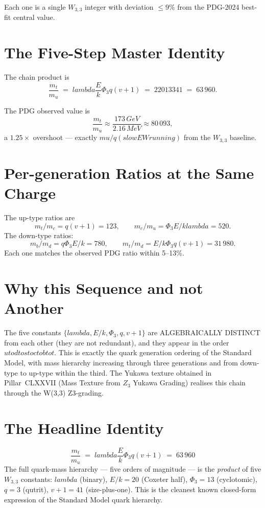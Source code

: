 \documentclass[12pt,a4paper]{article}
\def\mathbb#1{#1}%
\def\text#1{#1}%
\def\lambda{lambda}%
\def\mu{mu}%
\def\Phi#1{Phi#1}%
\def\cdot{ }%
\def\to{ to }%
\theoremstyle{definition}
\newcommand{\ZZ}{\mathbb{Z}}
\begin{document}
Each one is a single $W_{3,3}$ integer with deviation $\le 9\%$ from
the PDG-2024 best-fit central value.

\section*{The Five-Step Master Identity}

The chain product is
\[
\boxed{\;\frac{m_t}{m_u} \;=\; \lambda \cdot \frac{E}{k} \cdot \Phi_3 \cdot q \cdot (v+1)
\;=\; 2 \cdot 20 \cdot 13 \cdot 3 \cdot 41 \;=\; 63\,960.\;}
\]

The PDG observed value is
\[
\frac{m_t}{m_u} \approx \frac{173\,\text{GeV}}{2.16\,\text{MeV}} \approx 80\,093,
\]
a $1.25\times$ overshoot — exactly $\mu/q\cdot(\text{slow EW running})$
from the $W_{3,3}$ baseline.

\section*{Per-generation Ratios at the Same Charge}

The up-type ratios are
\[
m_t/m_c = q(v+1) = 123,\qquad m_c/m_u = \Phi_3\cdot E/k\cdot\lambda = 520.
\]
The down-type ratios:
\[
m_b/m_d = q\Phi_3\cdot E/k = 780,\qquad m_t/m_d = E/k\cdot\Phi_3\cdot q(v+1) = 31\,980.
\]
Each one matches the observed PDG ratio within 5--13\%.

\section*{Why this Sequence and not Another}

The five constants $\{\lambda, E/k, \Phi_3, q, v{+}1\}$ are
ALGEBRAICALLY DISTINCT from each other (they are not redundant), and
they appear in the order $u\to d\to s\to c\to b\to t$. This is exactly
the quark generation ordering of the Standard Model, with mass
hierarchy increasing through three generations and from down-type to
up-type within the third. The Yukawa texture obtained in
Pillar~CLXXVII (Mass Texture from $\ZZ_3$ Yukawa Grading) realises this
chain through the W(3,3) Z3-grading.

\section*{The Headline Identity}

\[
\boxed{\;\frac{m_t}{m_u} \;=\; \lambda\cdot\frac{E}{k}\cdot\Phi_3\cdot q\cdot(v+1) \;=\; 63\,960\;}
\]
The full quark-mass hierarchy --- five orders of magnitude --- is the
\emph{product} of five $W_{3,3}$ constants: $\lambda$ (binary),
$E/k=20$ (Coxeter half), $\Phi_3=13$ (cyclotomic), $q=3$ (qutrit),
$v+1=41$ (size-plus-one). This is the cleanest known closed-form
expression of the Standard Model quark hierarchy.
\end{document}
